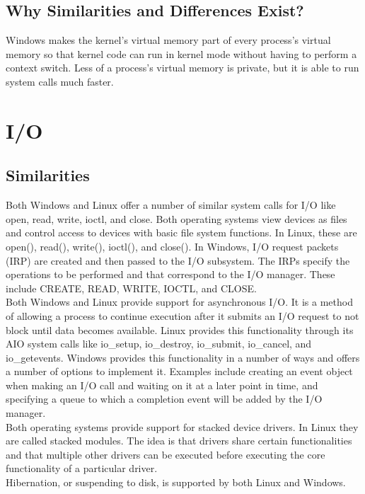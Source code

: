\documentclass[letterpaper,10pt,titlepage]{article}
\begin{document}
\subsection{Why Similarities and Differences Exist?}
Windows makes the kernel's virtual memory part of every process's virtual 
memory so that kernel code can run in kernel mode without having to perform a 
context switch. Less of a process's virtual memory is private, but it is able
to run system calls much faster. 
\section{I/O}
\subsection{Similarities}
Both Windows and Linux offer a number of similar system calls for I/O like 
open, read, write, ioctl, and close. Both operating systems view devices as 
files and control access to devices with basic file system functions. In 
Linux, these are open(), read(), write(), ioctl(), and close(). In Windows, 
I/O request packets (IRP) are created and then passed to the I/O subsystem. 
The IRPs specify the operations to be performed and that correspond to the 
I/O manager. These include CREATE, READ, WRITE, IOCTL, and CLOSE.
\\
\linebreak
Both Windows and Linux provide support for asynchronous I/O. It is a method of
allowing a process to continue execution after it submits an I/O request to 
not block until data becomes available. Linux provides this functionality 
through its AIO system calls like io\_setup, io\_destroy, io\_submit,
io\_cancel, and io\_getevents. Windows provides this functionality in a number
of ways and offers a number of options to implement it. Examples include 
creating an event object when making an I/O call and waiting on it at a later 
point in time, and specifying a queue to which a completion event will be 
added by the I/O manager.
\\
\linebreak
Both operating systems provide support for stacked device drivers. In Linux
they are called stacked modules. The idea is that drivers share certain 
functionalities and that multiple other drivers can be executed before 
executing the core functionality of a particular driver.
\\
\linebreak
Hibernation, or suspending to disk, is supported by both Linux and Windows.
\end{document}
